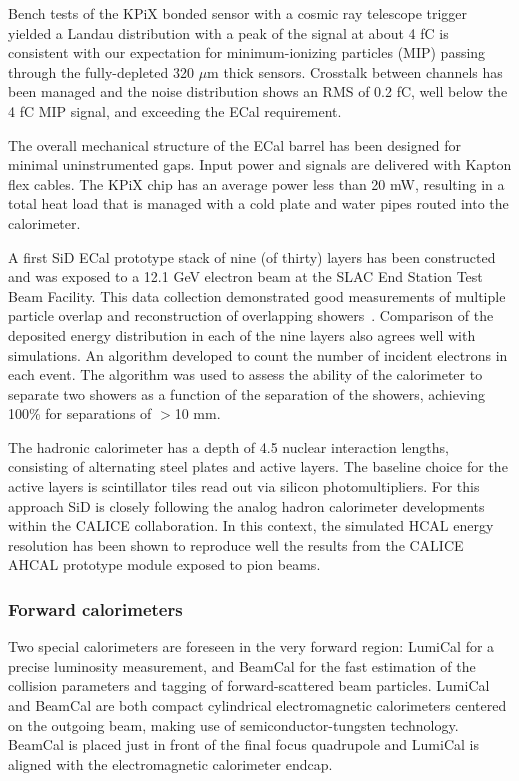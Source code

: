 Bench tests of the KPiX bonded sensor  with a cosmic ray telescope trigger yielded 
a Landau distribution with a peak of the signal at about 4 fC is consistent with our expectation for minimum-ionizing particles (MIP) passing through the fully-depleted 320 $\mu$m thick sensors. Crosstalk between channels has been managed and the 
 noise distribution shows an RMS of 0.2 fC, well below the 4 fC MIP signal, and exceeding the ECal requirement.

The overall mechanical structure of the ECal barrel has been designed for minimal uninstrumented gaps. Input power and signals are delivered with Kapton flex cables.
The KPiX chip has an average power less than 20 mW, resulting in a
total heat load  that is managed with a cold plate and water pipes routed 
into the calorimeter.

A first SiD ECal prototype stack of nine (of thirty) layers has been constructed and was exposed to a 12.1 GeV electron beam at the SLAC End Station Test Beam Facility. 
This data collection demonstrated good measurements of multiple particle overlap and reconstruction of overlapping showers~\cite{Steinhebel:2017qze}.  Comparison of the deposited energy distribution in each of the nine layers also agrees well with simulations.
An algorithm developed to count the number of incident electrons in each event. The algorithm was used to assess the ability of the calorimeter to separate two showers as a function of the separation of the showers, achieving 100\% for separations of $>$10 mm.



The hadronic
calorimeter has a depth of 4.5 nuclear interaction lengths, consisting of
alternating steel plates and active layers. The baseline choice for the active
layers is scintillator tiles read out via silicon photomultipliers. For this approach SiD is closely following the analog hadron calorimeter developments within the CALICE collaboration. In this context, the simulated HCAL energy resolution has been shown to reproduce well the results from the CALICE AHCAL prototype module exposed to pion beams.

\subsubsection{Forward calorimeters}

Two special calorimeters are foreseen in the very forward region: LumiCal for a precise luminosity measurement, and BeamCal for the fast estimation of the collision parameters and tagging of forward-scattered beam particles. LumiCal and BeamCal are both compact cylindrical electromagnetic calorimeters centered on the outgoing beam, making use of semiconductor-tungsten technology. BeamCal is placed just in front of the final focus quadrupole and LumiCal is aligned with the electromagnetic calorimeter endcap. 

